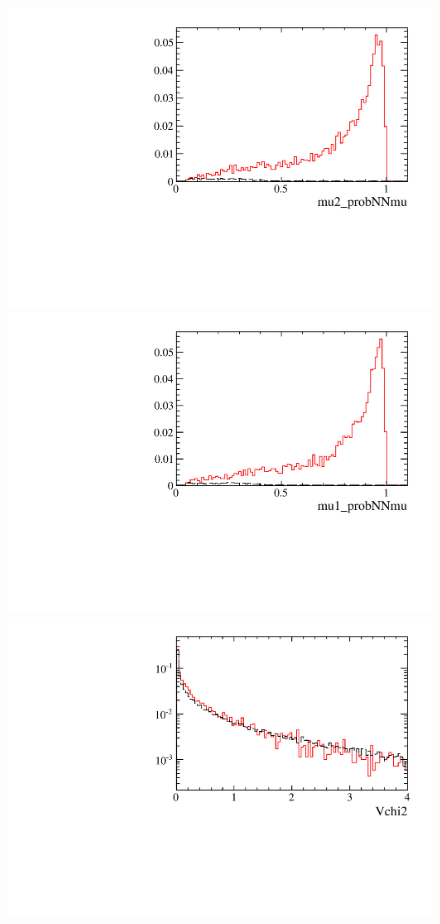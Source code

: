 \begin{figure} [htb!]
\begin{center}
\includegraphics[scale=0.20]{figs/mu2_probNNmuPARTIALptcut.pdf}
\includegraphics[scale=0.20]{figs/mu1_probNNmuPARTIALptcut.pdf}
\includegraphics[scale=0.20]{figs/Vchi2PARTIALptcut.pdf}

\end{center}
\end{figure}
